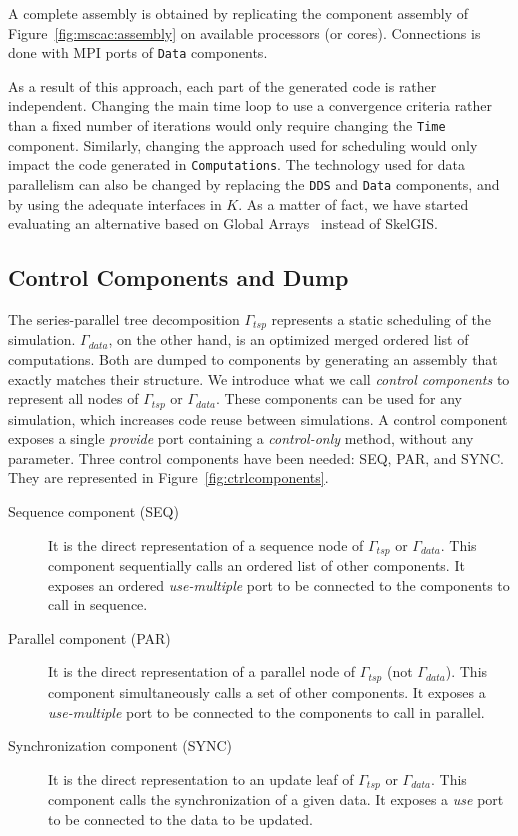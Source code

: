 A complete assembly is obtained by replicating the component assembly of Figure~\ref{fig:mscac:assembly} on available processors (or cores). Connections is done with MPI ports of \texttt{Data} components.

As a result of this approach, each part of the generated code is rather independent.
Changing the main time loop to use a convergence criteria rather than a fixed number of iterations would only require changing the \texttt{Time} component.
Similarly, changing the approach used for scheduling would only impact the code generated in \texttt{Computations}.
The technology used for data parallelism can also be changed by replacing the \texttt{DDS} and \texttt{Data} components, and by using the adequate interfaces in $K$. As a matter of fact, we have started evaluating an alternative based on Global Arrays~\cite{Nieplocha:2006:AAP:1125980.1125985} instead of SkelGIS.
  
\subsection{Control Components and Dump}
\label{sect:control}
The series-parallel tree decomposition $\Gamma_{tsp}$ represents a static scheduling of the simulation. $\Gamma_{data}$, on the other hand, is an optimized merged ordered list of computations. Both are dumped to components by generating an assembly that exactly matches their structure.
We introduce what we call \emph{control components} to represent all nodes of $\Gamma_{tsp}$ or $\Gamma_{data}$.
These components can be used for any simulation, which increases code reuse between simulations.
A control component exposes a single \emph{provide} port containing a \emph{control-only} method, without any parameter.
Three control components have been needed: SEQ, PAR, and SYNC. They are represented in Figure~\ref{fig:ctrlcomponents}.


\begin{description}
\item[Sequence component (SEQ)] It is the direct representation of a sequence node of $\Gamma_{tsp}$ or $\Gamma_{data}$. This component sequentially calls an ordered list of other components. It exposes an ordered \emph{use-multiple} port to be connected to the components to call in sequence.

\item[Parallel component (PAR)] It is the direct representation of a parallel node of $\Gamma_{tsp}$ (not $\Gamma_{data}$). This component simultaneously calls a set of other components. It exposes a \emph{use-multiple} port to be connected to the components to call in parallel.
  
\item[Synchronization component (SYNC)] It is the direct representation to an update leaf of $\Gamma_{tsp}$ or $\Gamma_{data}$. This component calls the synchronization of a given data. It exposes a \emph{use} port to be connected to the data to be updated.
\end{description}


